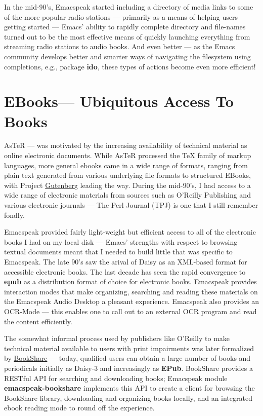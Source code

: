 \documentclass[11pt]{article}
\begin{document}
In the mid-90's, Emacspeak started including a directory of media
links to some of the more popular radio stations — primarily as a
means of helping users getting started — Emacs' ability to
rapidly complete directory and file-names turned out to be the
most effective means of quickly launching everything from
streaming radio stations to audio books. And even better — as the
Emacs community develops better and smarter ways of navigating
the filesystem using completions, e.g., package \textbf{ido}, these
types of actions become even more efficient!

\section{EBooks—   Ubiquitous Access To Books}
\label{sec-11}


AsTeR — was motivated by the increasing availability of technical
material as online electronic documents. While AsTeR processed
the \TeX{} family of markup languages, more general ebooks came in a
wide range of formats, ranging from plain text generated from
various underlying file formats to structured EBooks, with
Project \href{http://www.gutenberg.org/}{Gutenberg} leading the way. During the mid-90's, I had
access to a wide range of electronic materials from sources such
as O'Reilly Publishing and various electronic journals — The Perl
Journal (TPJ) is one that I still remember fondly.

Emacspeak provided fairly light-weight but efficient access to
all of the electronic books I had on my local disk — Emacs'
strengths with respect to browsing textual documents meant that I
needed to build little that was specific to Emacspeak. The late
90's saw the arival of Daisy as an XML-based format for
accessible electronic books. The last decade has seen the rapid
convergence to \textbf{epub} as a distribution format of choice for
electronic books. Emacspeak provides interaction modes that make
organizing, searching and reading these materials on the
Emacspeak Audio Desktop a pleasant experience. Emacspeak also
provides an OCR-Mode — this enables one to call out to an
external OCR program and read the content efficiently.

The somewhat informal process used by publishers like O'Reilly to
make technical material available to users with print impairments
was later formalized by \href{https://www.bookshare.org/}{BookShare} — today, qualified users can
obtain a large number of books and periodicals initially as
Daisy-3 and increasingly as \textbf{EPub}. BookShare provides a RESTful
API for searching and downloading books; Emacspeak module
\textbf{emacspeak-bookshare} implements this API to create a client for
browsing the BookShare library, downloading and organizing books
locally, and an integrated ebook reading mode to round off the
experience.
\end{document}
